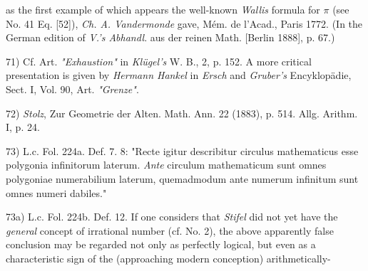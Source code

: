 \vfill
\leftline{\rule{2in}{0.4pt}}
\vspace{0.2cm}
{
\footnotesize
as the first example of which appears the well-known \textit{Wallis} formula for $\pi$ (see No. 41 Eq. [52]), \textit{Ch. A. Vandermonde} gave, Mém. de l'Acad., Paris 1772. (In the German edition of \textit{V.'s Abhandl}. aus der reinen Math. [Berlin 1888], p. 67.)

71) Cf. Art. \textit{"Exhaustion"} in \textit{Klügel's} W. B., 2, p. 152. A more critical presentation is given by \textit{Hermann Hankel} in \textit{Ersch} and \textit{Gruber's} Encyklopädie, Sect. I, Vol. 90, Art. \textit{"Grenze"}.

72) \textit{Stolz}, Zur Geometrie der Alten. Math. Ann. 22 (1883), p. 514. Allg. Arithm. I, p. 24.

73) L.c. Fol. 224a. Def. 7. 8: "Recte igitur describitur circulus mathematicus esse polygonia infinitorum laterum. \textit{Ante} circulum mathematicum sunt omnes polygoniae numerabilium laterum, quemadmodum ante numerum infinitum sunt omnes numeri dabiles."

73a) L.c. Fol. 224b. Def. 12. If one considers that \textit{Stifel} did not yet have the \textit{general} concept of irrational number (cf. No. 2), the above apparently false conclusion may be regarded not only as perfectly logical, but even as a characteristic sign of the (approaching modern conception) arithmetically-

}